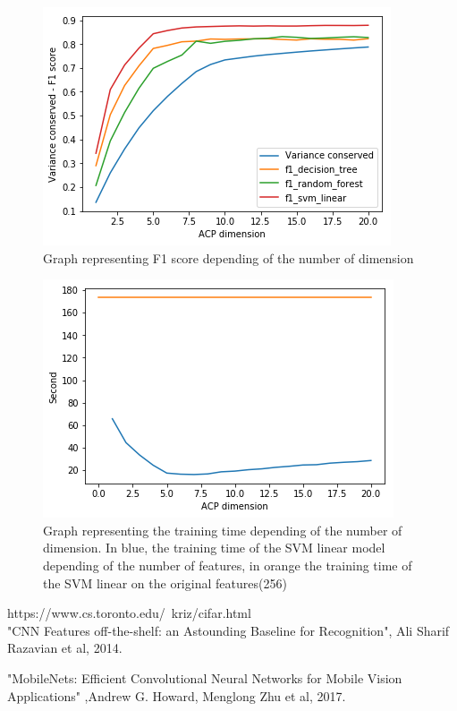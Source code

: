 \documentclass[10pt, a4paper, twocolumn]{article} %
\begin{document}
\begin{figure}[H]
\center
	\includegraphics[scale=0.4]{graph_1.png} %
	\caption{\label{fig:graph_1}Graph representing F1 score depending of the number of dimension} %
\end{figure}

\begin{figure}[H]
\center
	\includegraphics[scale=0.4]{graph_2.png} %
	\caption{\label{fig:graph_2}Graph representing the training time depending of the number of dimension. In blue, the training time of the SVM linear model depending of the number of features, in orange the training time of the SVM linear on the original features(256)} %
\end{figure}


\vspace*{6cm}
\begin{thebibliography}{abcde}

	 https://www.cs.toronto.edu/~kriz/cifar.html\\
     "CNN Features off-the-shelf: an Astounding Baseline for Recognition", Ali Sharif Razavian et al, 2014.
 
     "MobileNets: Efficient Convolutional Neural Networks for Mobile Vision Applications" ,Andrew G. Howard, Menglong Zhu et al, 2017.
\end{thebibliography}

\end{document}
